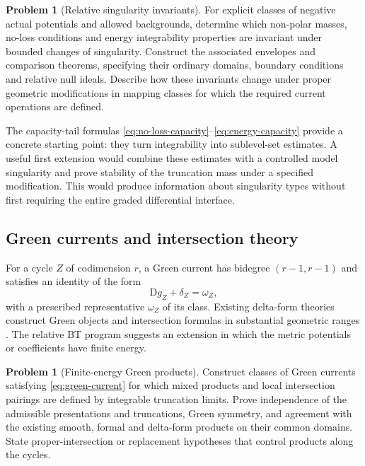 \documentclass[11pt,a4paper]{article}
\newcommand{\MathEqref}[1]{{\hypersetup{linkcolor=EquationLink}\eqref{#1}}}
\theoremstyle{definition}
\newtheorem{problem}[theorem]{Problem}
\theoremstyle{remark}
\numberwithin{equation}{section}
\newcommand{\D}{\mathrm D}
\begin{document}
\begin{problem}[Relative singularity invariants]
\label{problem:singularities}
For explicit classes of negative actual potentials and allowed
backgrounds, determine which non-polar masses, no-loss conditions and
energy integrability properties are invariant under bounded changes
of singularity.  Construct the associated envelopes and comparison
theorems, specifying their ordinary domains, boundary conditions and
relative null ideals.  Describe how these invariants change under
proper geometric modifications in mapping classes for which the
required current operations are defined.
\end{problem}

The capacity-tail formulas
\MathEqref{eq:no-loss-capacity}--\MathEqref{eq:energy-capacity}
provide a concrete starting point: they turn integrability into
sublevel-set estimates.  A useful first extension would combine these
estimates with a controlled model singularity and prove stability of
the truncation mass under a specified modification.  This would
produce information about singularity types without first requiring
the entire graded differential interface.

\subsection{Green currents and intersection theory}

For a cycle $Z$ of codimension $r$, a Green current has bidegree
$(r-1,r-1)$ and satisfies an identity of the form
\begin{equation}
                              \D g_Z+\delta_Z=\omega_Z,
                         \label{eq:green-current}
\end{equation}
with a prescribed representative $\omega_Z$ of its class.  Existing
delta-form theories construct Green objects and intersection
formulas in substantial geometric ranges \cite{GK,Mihatsch}.
The relative BT program suggests an extension in which the metric
potentials or coefficients have finite energy.

\begin{problem}[Finite-energy Green products]
\label{problem:green}
Construct classes of Green currents satisfying
\MathEqref{eq:green-current} for which mixed products and local
intersection pairings are defined by integrable truncation limits.
Prove independence of the admissible presentations and truncations,
Green symmetry, and agreement with the existing smooth, formal and
delta-form products on their common domains.  State proper-intersection
or replacement hypotheses that control products along the cycles.
\end{problem}
\end{document}

